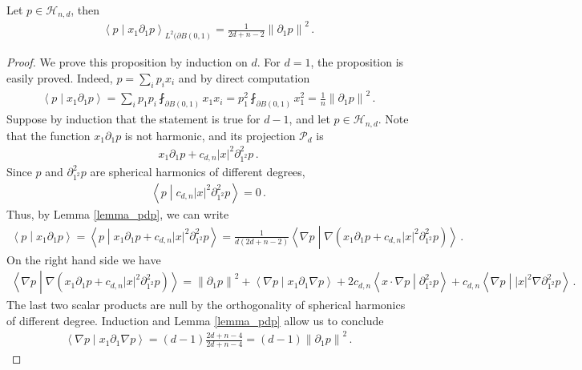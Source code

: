 \documentclass[11pt]{article}
\begin{document}
\begin{lemma}\label{lemma_+}
 Let $p\in {\mathcal{H}}_{n,d}$, then 
 \begin{gather}
  {\left\langle{p}\middle\vert{x_1 \partial_1 p}\right\rangle}_{L^2(\partial B(0,1)} = \frac{1}{2d+n-2}{\left\|{\partial_1 p}\right\|}^2\, .
 \end{gather}
\end{lemma}
\begin{proof}
 We prove this proposition by induction on $d$. For $d=1$, the proposition is easily proved. Indeed, $p= \sum_i p_i x_i$ and by direct computation 
 \begin{gather}
  {\left\langle{p}\middle\vert{x_1\partial_1 p}\right\rangle} = \sum_i p_1p_i\fint_{\partial B(0,1)}x_1 x_i = p_1^2 \fint_{\partial B(0,1)} x_1 ^2 =\frac{1}{n} {\left\|{\partial_1 p}\right\|}^2\, . 
 \end{gather}
Suppose by induction that the statement is true for $d-1$, and let $p\in {\mathcal{H}}_{n,d}$. Note that the function $x_1 \partial_1 p$ is not harmonic, and its projection ${\mathcal{P}}_d$ is
\begin{gather}
 x_1 \partial_1 p +c_{d,n} {\left|x\right|} ^2 \partial^2_{1^2} p\, .
\end{gather}
Since $p$ and $\partial^2_{1^2} p$ are spherical harmonics of different degrees, 
\begin{gather}
 {\left\langle{p}\middle\vert{c_{d,n} {\left|x\right|} ^2 \partial^2_{1^2} p}\right\rangle} =0\, .
\end{gather}
Thus, by Lemma \ref{lemma_pdp}, we can write
\begin{gather}
 {\left\langle{p}\middle\vert{x_1 \partial_1 p }\right\rangle} = {\left\langle{p}\middle\vert{x_1 \partial_1 p + c_{d,n} {\left|x\right|} ^2 \partial^2_{1^2} p}\right\rangle}=\frac 1 {d(2d+n-2)}{\left\langle{\nabla p}\middle\vert{\nabla {\left({x_1 \partial_1 p + c_{d,n} {\left|x\right|} ^2 \partial^2_{1^2} p}\right)}}\right\rangle}\, .
\end{gather}
On the right hand side we have
\begin{gather}
 {\left\langle{\nabla p}\middle\vert{\nabla {\left({x_1 \partial_1 p + c_{d,n}{\left|x\right|} ^2 \partial^2_{1^2} p}\right)}}\right\rangle} = {\left\|{\partial_1 p}\right\|}^2 + {\left\langle{\nabla p}\middle\vert{x_1 \partial_1 \nabla p}\right\rangle} + 2c_{d,n} {\left\langle{x\cdot\nabla p}\middle\vert{\partial^2_{1^2} p}\right\rangle} + c_{d,n} {\left\langle{\nabla p}\middle\vert{{\left|x\right|} ^2 \nabla \partial^2_{1^2} p}\right\rangle}\, .
\end{gather}
The last two scalar products are null by the orthogonality of spherical harmonics of different degree. Induction and Lemma \ref{lemma_pdp} allow us to conclude
\begin{gather}
 {\left\langle{\nabla p}\middle\vert{x_1 \partial_1 \nabla p}\right\rangle} = (d-1)\frac{2d+n-4}{2d+n-4}=(d-1){\left\|{\partial_1 p}\right\|}^2\, .
\end{gather}
\end{proof}
\end{document}
